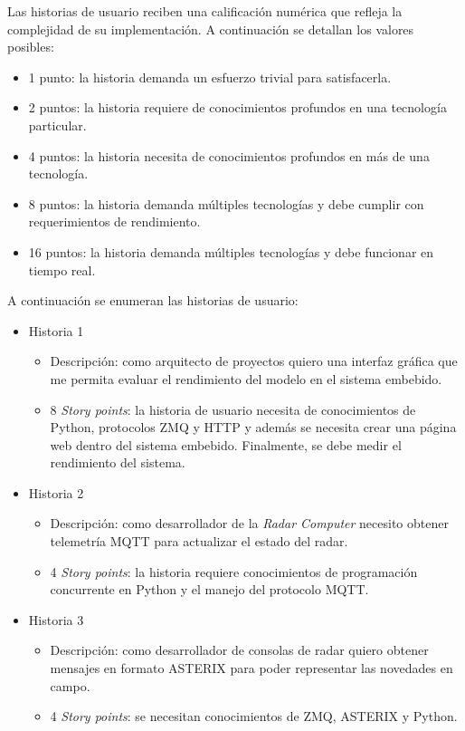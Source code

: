\documentclass[
11pt, %
]{charter}
\begin{document}
Las historias de usuario reciben una calificación numérica que refleja la
complejidad de su implementación.
A continuación se detallan los valores posibles:

\begin{itemize}
\item 1 punto: la historia demanda un esfuerzo trivial para satisfacerla.
\item 2 puntos: la historia requiere de conocimientos profundos en una
  tecnología particular.
\item 4 puntos: la historia necesita de conocimientos profundos en más de una tecnología.
\item 8 puntos: la historia demanda múltiples tecnologías y debe cumplir con
  requerimientos de rendimiento.
\item 16 puntos: la historia demanda múltiples tecnologías y debe funcionar en
  tiempo real.
\end{itemize}

A continuación se enumeran las historias de usuario:

\begin{itemize}
  \item Historia 1
    \begin{itemize}
      \item Descripción: como arquitecto de proyectos quiero una interfaz gráfica que me permita
        evaluar el rendimiento del modelo en el sistema embebido.
      \item 8 \emph{Story points}: la historia de usuario necesita de
        conocimientos de Python, protocolos ZMQ y HTTP y además se necesita crear
        una página web dentro del sistema embebido. Finalmente, se debe medir el
        rendimiento del sistema.
    \end{itemize}
  \item Historia 2
    \begin{itemize}
      \item Descripción: como desarrollador de la \emph{Radar Computer} necesito obtener
        telemetría MQTT para actualizar el estado del radar.
      \item 4 \emph{Story points}: la historia requiere conocimientos de
        programación concurrente en Python y el manejo del protocolo MQTT.
    \end{itemize}
  \item Historia 3
    \begin{itemize}
      \item Descripción: como desarrollador de consolas de radar quiero obtener mensajes en
        formato ASTERIX para poder representar las novedades en campo.
      \item 4 \emph{Story points}: se necesitan conocimientos de ZMQ, ASTERIX
        y Python.
    \end{itemize}
\end{itemize}
\end{document}

